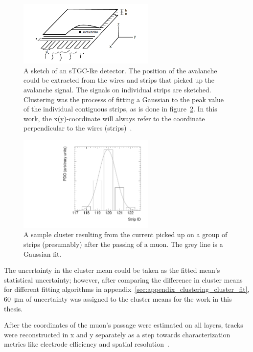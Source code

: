\begin{figure}
    \centering
    \includegraphics[width = 0.6\textwidth]{figures/mwpc_lefebvre_thesis_gatti.png}
    \caption{A sketch of an sTGC-lke detector. The position of the avalanche could be extracted from the wires and strips that picked up the avalanche signal. The signals on individual strips are sketched. Clustering was the processs of fitting a Gaussian to the peak value of the individual contiguous strips, as is done in figure~\ref{fig:sample_cluster}. In this work, the x(y)-coordinate will always refer to the coordinate perpendicular to the wires (strips)~\cite{lefebvre_thesis, gatti_optimum_1979}.}
    \label{fig:mwpc_coords}
\end{figure}

\begin{figure}
    \centering
    \includegraphics[width = 0.6\textwidth]{figures/sample_cluster_QL2C04_event5_layer2.pdf}
    \caption{A sample cluster resulting from the current picked up on a group of strips (presumably) after the passing of a muon. The grey line is a Gaussian fit.}
    \label{fig:sample_cluster}
\end{figure}

The uncertainty in the cluster mean could be taken as the fitted mean's statistical uncertainty; however, after comparing the difference in cluster means for different fitting algorithms in appendix~\ref{sec:appendix_clustering_cluster_fit}, \SI{60}{\micro\meter} of uncertainty was assigned to the cluster means for the work in this thesis.
    
After the coordinates of the muon's passage were estimated on all layers, tracks were reconstructed in x and y separately as a step towards characterization metrics like electrode efficiency and spatial resolution~\cite{lefebvre_thesis}. 

